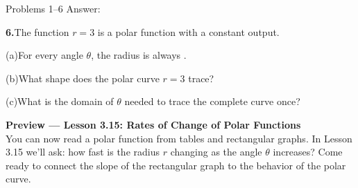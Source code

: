 \documentclass[10pt]{article}
\begin{document}
\begin{notesbox}{Problems 1--6}
Answer: \underline{\hspace{1.5cm}}

\vspace{0.14in}
\textbf{6.}\quad The function $r = 3$ is a polar function with a constant output.

\vspace{4pt}
(a)\quad For every angle $\theta$, the radius is always \underline{\hspace{1.5cm}}.

\vspace{4pt}
(b)\quad What shape does the polar curve $r = 3$ trace? \underline{\hspace{4cm}}

\vspace{4pt}
(c)\quad What is the domain of $\theta$ needed to trace the complete curve once?
\underline{\hspace{4cm}}

\end{notesbox}

\vspace{0.08in}

\begin{tcolorbox}[colback=navylight, colframe=navy, arc=2mm,
    left=3mm, right=3mm, top=2mm, bottom=2mm]
\small\textbf{Preview --- Lesson 3.15: Rates of Change of Polar Functions}\\
You can now read a polar function from tables and rectangular graphs. In Lesson 3.15
we'll ask: how fast is the radius $r$ changing as the angle $\theta$ increases?
Come ready to connect the slope of the rectangular graph to the behavior of the
polar curve.
\end{tcolorbox}
\end{document}
